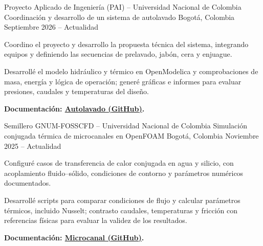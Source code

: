 


\begin{cventries}

    \cventry
        {Proyecto Aplicado de Ingeniería (PAI) -- Universidad Nacional de Colombia} %
        {Coordinación y desarrollo de un sistema de autolavado} %
        {Bogotá, Colombia} %
        {Septiembre 2026 -- Actualidad} %
        {
            \begin{cvitems}
                \item {Coordino el proyecto y desarrollo la propuesta técnica del sistema, integrando equipos y definiendo las secuencias de prelavado, jabón, cera y enjuague.}
                \item {Desarrollé el modelo hidráulico y térmico en OpenModelica y comprobaciones de masa, energía y lógica de operación; generé gráficas e informes para evaluar presiones, caudales y temperaturas del diseño.}
                \item \textbf{{Documentación: \href{https://github.com/dokiun/Autolavado}{Autolavado (GitHub)}.}}
            \end{cvitems}
        }

    \cventry
        {Semillero GNUM-FOSSCFD -- Universidad Nacional de Colombia} %
        {Simulación conjugada térmica de microcanales en OpenFOAM} %
        {Bogotá, Colombia} %
        {Noviembre 2025 -- Actualidad} %
        {
            \begin{cvitems}
                \item {Configuré casos de transferencia de calor conjugada en agua y silicio, con acoplamiento fluido--sólido, condiciones de contorno y parámetros numéricos documentados.}
                \item {Desarrollé scripts para comparar condiciones de flujo y calcular parámetros térmicos, incluido Nusselt; contrasto caudales, temperaturas y fricción con referencias físicas para evaluar la validez de los resultados.}
                \item \textbf{{Documentación: \href{https://github.com/dokiun/Microcanal}{Microcanal (GitHub)}.}}
            \end{cvitems}
        }


\end{cventries}
